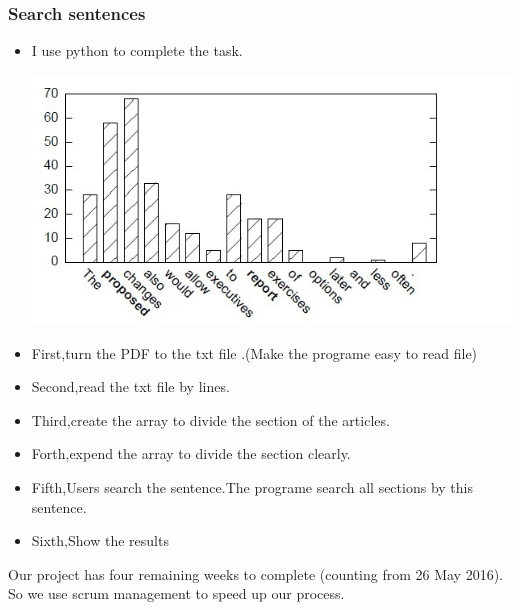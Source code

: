 \subsubsection*{Search sentences}
\begin{itemize}
	\item I use python to complete the task. 
	\begin{center}
		\includegraphics[width=0.8\columnwidth]{Union_Background_Chart_2}
	\end{center}
	\item First,turn the PDF to the txt file .(Make the programe easy to read file)\\ 
	\item Second,read the txt file by lines.\\ 	
	\item Third,create the array to divide the section of the articles.\\ 	
	\item Forth,expend the array to divide the section clearly.\\ 	
	\item Fifth,Users search the sentence.The programe search all sections by this sentence.\\
	\item Sixth,Show the results\\  		
	
\end{itemize}
Our project has four remaining weeks to complete (counting from 26 May 2016). 
So we use scrum management to speed up our process.

\newpage %
